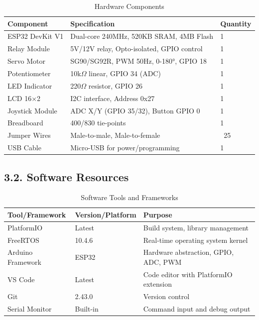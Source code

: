 \documentclass[12pt]{article}
\begin{document}
\begin{table}[H]
	\centering
	\caption{Hardware Components}
	\label{tab:hardware-resources}
	\begin{tabular}{|l|l|l|}
		\hline
		\textbf{Component} & \textbf{Specification} & \textbf{Quantity} \\
		\hline
		ESP32 DevKit V1 & Dual-core 240MHz, 520KB SRAM, 4MB Flash & 1 \\
		\hline
		Relay Module & 5V/12V relay, Opto-isolated, GPIO control & 1 \\
		\hline
		Servo Motor & SG90/SG92R, PWM 50Hz, 0-180°, GPIO 18 & 1 \\
		\hline
		Potentiometer & 10k$\Omega$ linear, GPIO 34 (ADC) & 1 \\
		\hline
		LED Indicator & 220$\Omega$ resistor, GPIO 26 & 1 \\
		\hline
		LCD 16×2 & I2C interface, Address 0x27 & 1 \\
		\hline
		Joystick Module & ADC X/Y (GPIO 35/32), Button GPIO 0 & 1 \\
		\hline
		Breadboard & 400/830 tie-points & 1 \\
		\hline
		Jumper Wires & Male-to-male, Male-to-female & ~25 \\
		\hline
		USB Cable & Micro-USB for power/programming & 1 \\
		\hline
	\end{tabular}
\end{table}

\subsection*{3.2. Software Resources}

\begin{table}[H]
	\centering
	\caption{Software Tools and Frameworks}
	\label{tab:software-resources}
	\begin{tabular}{|l|l|l|}
		\hline
		\textbf{Tool/Framework} & \textbf{Version/Platform} & \textbf{Purpose} \\
		\hline
		PlatformIO & Latest & Build system, library management \\
		\hline
		FreeRTOS & 10.4.6 & Real-time operating system kernel \\
		\hline
		Arduino Framework & ESP32 & Hardware abstraction, GPIO, ADC, PWM \\
		\hline
		VS Code & Latest & Code editor with PlatformIO extension \\
		\hline
		Git & 2.43.0 & Version control \\
		\hline
		Serial Monitor & Built-in & Command input and debug output \\
		\hline
	\end{tabular}
\end{table}
\end{document}
